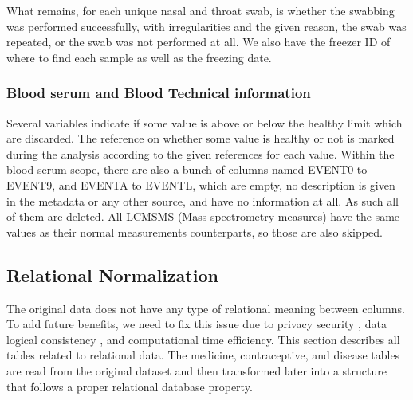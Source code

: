 What remains, for each unique nasal and throat swab, is whether the swabbing was performed successfully, with irregularities and the given reason, the swab was repeated, or the swab was not performed at all. We also have the freezer ID of where to find each sample as well as the freezing date.

\subsubsection{Blood serum and Blood Technical information}

Several variables indicate if some value is above or below the healthy limit which are discarded. The reference on whether some value is healthy or not is marked during the analysis according to the given references for each value. Within the blood serum scope, there are also a bunch of columns named EVENT0 to EVENT9, and EVENTA to EVENTL, which are empty, no description is given in the metadata or any other source, and have no information at all. As such all of them are deleted. All LCMSMS (Mass spectrometry measures) have the same values as their normal measurements counterparts, so those are also skipped.

\subsection{Relational Normalization}
\label{ssec:normalization}

The original data does not have any type of relational meaning between columns. To add future benefits, we need to fix this issue due to privacy security \cite{DomingoFerrer2009}, data logical consistency \cite{DomingoFerrer2009}, and computational time efficiency. This section describes all tables related to relational data. The medicine, contraceptive, and disease tables are read from the original dataset and then transformed later into a structure that follows a proper relational database property.



